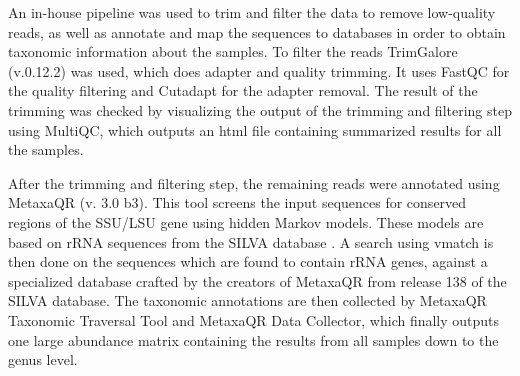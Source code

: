 
An in-house pipeline \cite{wenne2025Pipeline1} was used to trim and filter the data to remove low-quality reads, as well as annotate and map the sequences to databases in order to obtain taxonomic information about the samples.
To filter the reads TrimGalore (v.0.12.2) \cite{krueger2023TrimGalore0122} was used, which does adapter and quality trimming. It uses FastQC for the quality filtering and Cutadapt for the adapter removal.
The result of the trimming was checked by visualizing the output of the trimming and filtering step using MultiQC\cite{ewels2016MultiQCSummarizeAnalysis}, which outputs an html file containing summarized results for all the samples. 


After the trimming and filtering step, the remaining reads were annotated using MetaxaQR (v. 3.0 b3)\cite{bengtsson-palme2015Metaxa2Improved}. This tool screens the input sequences for conserved regions of the SSU/LSU gene using hidden Markov models. These models are based on rRNA sequences from the SILVA database\cite{quast2012SILVARibosomalRNA} .
    A search using vmatch\cite{kurtzVmatchLargeScale} is then done on the sequences which are found to contain rRNA genes, against a specialized database crafted by the creators of MetaxaQR from release 138 of the SILVA database\cite{bengtsson-palmeMetaxaQRFAQMicrobiologyse}.%
The taxonomic annotations are then collected by MetaxaQR Taxonomic Traversal Tool and MetaxaQR Data Collector, which finally outputs one large abundance matrix containing the results from all samples down to the genus level. 


